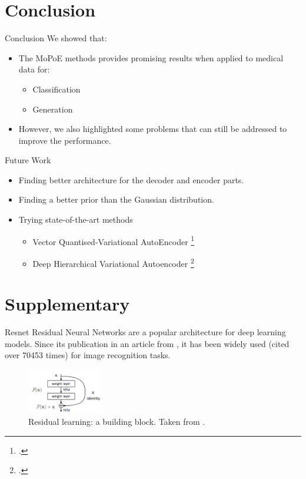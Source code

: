     \section{Conclusion}
    \begin{frame}{Conclusion}
    We showed that:
    \begin{itemize}
        \item The MoPoE methods provides promising results when applied to medical data for:
        \begin{itemize}
            \item Classification
            \item Generation
        \end{itemize}
    \item However, we also highlighted some problems that can still be addressed to improve the performance.
    \end{itemize}
    \end{frame}
    
    \begin{frame}{Future Work}
    \begin{itemize}
        \item Finding better architecture for the decoder and encoder parts.
        \item Finding a better prior than the Gaussian distribution.
        \item Trying state-of-the-art methods
        \begin{itemize}
            \item Vector Quantised-Variational AutoEncoder \footcite{oord2018neural}
            \item Deep Hierarchical Variational Autoencoder \footcite{vahdat2021nvae}
        \end{itemize}
        
    \end{itemize}

    \end{frame}
    
    \printbibliography
    
    \section{Supplementary}
    
    \begin{frame}{Resnet}
        Residual Neural Networks are a popular architecture for deep learning models.
        Since its publication in an article from \cite{he2016deep}, it has been widely used (cited over 70453 times) for image recognition tasks.
        \begin{figure}
            \includegraphics[width=0.3\textwidth, keepaspectratio]{slides/Residual_block}
            \caption{Residual learning: a building block. Taken from \cite{he2016deep}.}
        \end{figure}
    \end{frame}
    
